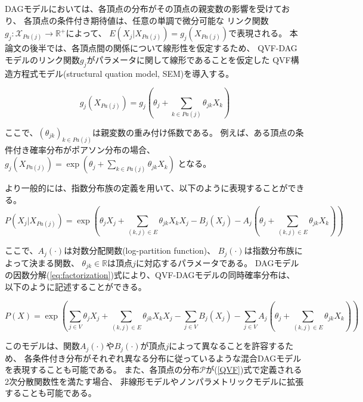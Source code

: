 DAGモデルにおいては、各頂点の分布がその頂点の親変数の影響を受けており、
各頂点の条件付き期待値は、任意の単調で微分可能な
リンク関数$g_j \colon \mathcal X_{Pa(j)} \rightarrow \mathbb R^+$によって、
$E(X_j|X_{Pa(j)}) = g_j(X_{Pa(j)})$で表現される。
本論文の後半では、各頂点間の関係について線形性を仮定するため、
QVF-DAGモデルのリンク関数$g_j$がパラメータに関して線形であることを仮定した
QVF構造方程式モデル(structural quation model, SEM)を導入する。

\begin{equation}
  g_j(X_{Pa(j)}) = g_j \left(\theta_j + \sum_{k \in Pa(j)} \theta_{jk}X_k \right)
\end{equation}

ここで、$(\theta_{jk})_{k \in Pa(j)}$は親変数の重み付け係数である。
例えば、ある頂点の条件付き確率分布がポアソン分布の場合、
$g_j(X_{Pa(j)}) = \exp(\theta_j + \sum_{k \in Pa(j)} \theta_{jk}X_k)$
となる。

より一般的には、指数分布族の定義を用いて、以下のように表現することができる。
\begin{equation}
  P(X_j|X_{Pa(j)}) = \exp \left( \theta_{j}X_j  + \sum_{(k,j)\in E} \theta_{jk}X_k X_j -
  B_j(X_j) - A_j \left( \theta_{j} + \sum_{(k,j) \in E} \theta_{jk} X_k \right) \right)
\end{equation}

ここで、$A_j(\cdot)$は対数分配関数(log-partition function)、
$B_j(\cdot)$は指数分布族によって決まる関数、
$\theta_{jk}\in \mathbb R$は頂点$j$に対応するパラメータである。
DAGモデルの因数分解(\ref{eq:factorization})式により、QVF-DAGモデルの同時確率分布は、
以下のように記述することができる。

\begin{equation}
  P(X) = \exp \left( \sum_{j\in V} \theta_{j}X_j + \sum_{(k,j)\in E} \theta_{jk}X_k X_j
  - \sum_{j \in V} B_j(X_j) - \sum_{j \in V} A_j
  \left( \theta_{j} + \sum_{(k,j)\in E} \theta_{jk} X_k \right)\right)
  \label{eq:QVF_factorization}
\end{equation}

このモデルは、関数$A_j(\cdot)$や$B_j(\cdot)$が頂点$j$によって異なることを許容するため、
各条件付き分布がそれぞれ異なる分布に従っているような混合DAGモデルを表現することも可能である。
また、各頂点の分布$\mathcal P$が(\ref{QVF})式で定義される2次分散関数性を満たす場合、
非線形モデルやノンパラメトリックモデルに拡張することも可能である。
